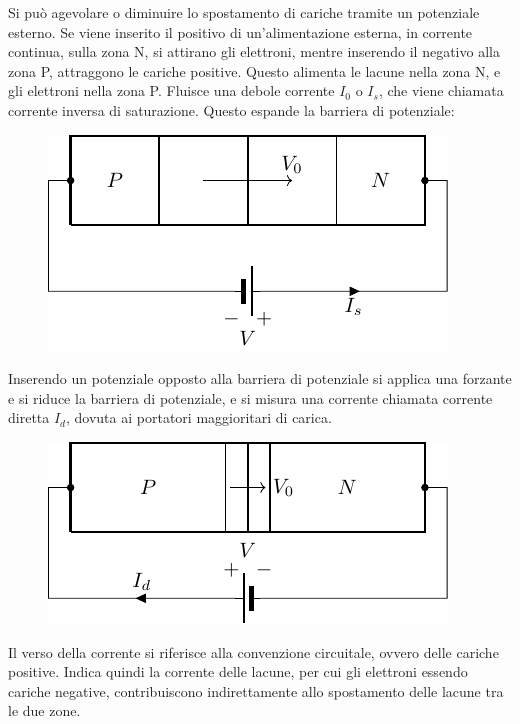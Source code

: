 \documentclass{article}
\numberwithin{equation}{subsection}
\begin{document}
Si può agevolare o diminuire lo spostamento di cariche tramite un potenziale esterno. Se viene inserito il positivo di un'alimentazione esterna, in corrente 
continua, sulla zona N, si attirano 
gli elettroni, mentre inserendo il negativo alla zona P, attraggono le cariche positive. Questo alimenta le lacune nella zona N, e gli elettroni nella zona P. 
Fluisce una debole corrente $I_0$ o $I_s$, che viene chiamata corrente inversa di saturazione. Questo espande la barriera di potenziale:
\begin{figure}[H]%
    \centering
    \includegraphics{corrente-saturazione.pdf}%
    \label{fig:corrente-saturazione}
\end{figure}


Inserendo un potenziale opposto alla barriera di potenziale si applica una forzante e si riduce la barriera di potenziale, e si misura una corrente chiamata corrente diretta 
$I_d$, dovuta ai portatori maggioritari di carica. 
\begin{figure}[H]%
    \centering
    \includegraphics{corrente-diretta.pdf}%
    \label{fig:corrente-diretta}
\end{figure}

Il verso della corrente si riferisce alla convenzione circuitale, ovvero delle cariche positive. Indica quindi la corrente delle lacune, per cui gli 
elettroni essendo cariche negative, contribuiscono indirettamente allo spostamento delle lacune tra le due zone. 
\end{document}
